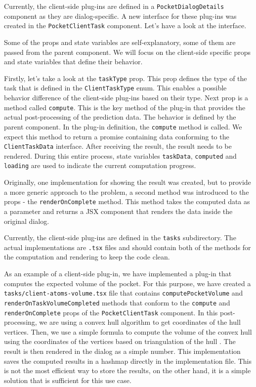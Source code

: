 Currently, the client-side plug-ins are defined in a \texttt{PocketDialogDetails} component as they are dialog-specific. A new interface for these plug-ins was created in the \texttt{PocketClientTask} component. Let's have a look at the interface.



Some of the props and state variables are self-explanatory, some of them are passed from the parent component. We will focus on the client-side specific props and state variables that define their behavior.

Firstly, let's take a look at the \texttt{taskType} prop. This prop defines the type of the task that is defined in the \texttt{ClientTaskType} enum. This enables a possible behavior difference of the client-side plug-ins based on their type. Next prop is a method called \texttt{compute}. This is the key method of the plug-in that provides the actual post-processing of the prediction data. The behavior is defined by the parent component. In the plug-in definition, the \texttt{compute} method is called. We expect this method to return a promise containing data conforming to the \texttt{ClientTaskData} interface. After receiving the result, the result needs to be rendered. During this entire process, state variables \texttt{taskData}, \texttt{computed} and \texttt{loading} are used to indicate the current computation progress.

Originally, one implementation for showing the result was created, but to provide a more generic approach to the problem, a second method was introduced to the props - the \texttt{renderOnComplete} method. This method takes the computed data as a parameter and returns a JSX component that renders the data inside the original dialog.

Currently, the client-side plug-ins are defined in the \texttt{tasks} subdirectory. The actual implementations are \texttt{.tsx} files and should contain both of the methods for the computation and rendering to keep the code clean.

As an example of a client-side plug-in, we have implemented a plug-in that computes the expected volume of the pocket. For this purpose, we have created a \texttt{tasks/client-atoms-volume.tsx} file that contains \texttt{computePocketVolume} and \texttt{renderOnTaskVolumeCompleted} methods that conform to the \texttt{compute} and \texttt{renderOnComplete} props of the \texttt{PocketClientTask} component. In this post-processing, we are using a convex hull algorithm to get coordinates of the hull vertices. Then, we use a simple formula to compute the volume of the convex hull using the coordinates of the vertices based on triangulation of the hull \cite{zhang2001efficient}. The result is then rendered in the dialog as a simple number. This implementation saves the computed results in a hashmap directly in the implementation file. This is not the most efficient way to store the results, on the other hand, it is a simple solution that is sufficient for this use case.

